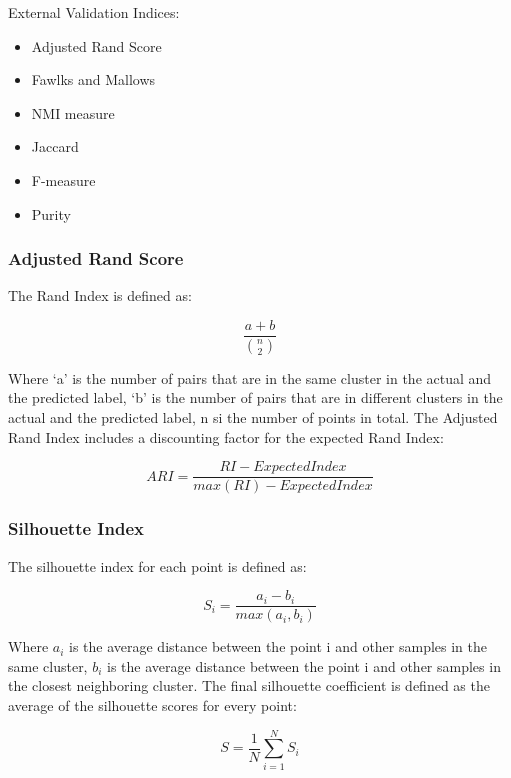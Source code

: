 \documentclass{article}
\begin{document}
External Validation Indices:

\begin{itemize}
  \item Adjusted Rand Score
  \item Fawlks and Mallows
  \item NMI measure
  \item Jaccard
  \item F-measure
  \item Purity
\end{itemize}

\subsubsection{Adjusted Rand Score}
The Rand Index is defined as:

\begin{equation}
  \frac{a + b}{\binom{n}{2}}
\end{equation}

Where ‘a’ is the number of pairs that are in the same cluster in the actual and the predicted label, ‘b’ is the number of pairs that are in different clusters in the actual and the predicted label, n si the number of points in total. The Adjusted Rand Index includes a discounting factor for the expected Rand Index:

\begin{equation}
  ARI = \frac{RI - ExpectedIndex}{max(RI) - ExpectedIndex}
\end{equation}

\subsubsection{Silhouette Index}
The silhouette index for each point is defined as:

\begin{equation}
  S_i = \frac{a_i - b_i}{max(a_i, b_i)}
\end{equation}

Where $a_i$ is the average distance between the point i and other samples in the same cluster, $b_i$ is the average distance between the point i and other samples in the closest neighboring cluster. The final silhouette coefficient is defined as the average of the silhouette scores for every point:

\begin{equation}
  S = \frac{1}{N} \sum_{i = 1}^{N} S_i
\end{equation}
\end{document}
